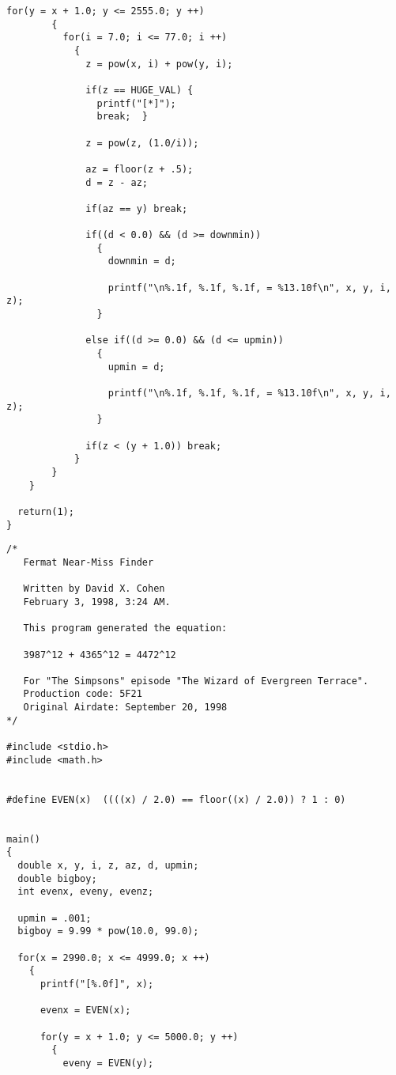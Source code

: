 \begin{appendix}
\begin{lstlisting}[caption={Fermat Near-Miss Finder (Version 1)}, captionpos=b]
      for(y = x + 1.0; y <= 2555.0; y ++)
        {
          for(i = 7.0; i <= 77.0; i ++)
            {
              z = pow(x, i) + pow(y, i);

              if(z == HUGE_VAL) {
                printf("[*]");
                break;  }

              z = pow(z, (1.0/i));

              az = floor(z + .5);
              d = z - az;

              if(az == y) break;

              if((d < 0.0) && (d >= downmin))
                {
                  downmin = d;

                  printf("\n%.1f, %.1f, %.1f, = %13.10f\n", x, y, i, z);
                }

              else if((d >= 0.0) && (d <= upmin))
                {
                  upmin = d;

                  printf("\n%.1f, %.1f, %.1f, = %13.10f\n", x, y, i, z);
                }

              if(z < (y + 1.0)) break;
            }
        }
    }

  return(1);
}
\end{lstlisting}

\begin{lstlisting}[caption={Fermat Near-Miss Finder (Version 2)}, captionpos=b]
/*
   Fermat Near-Miss Finder

   Written by David X. Cohen
   February 3, 1998, 3:24 AM.
   
   This program generated the equation:

   3987^12 + 4365^12 = 4472^12

   For "The Simpsons" episode "The Wizard of Evergreen Terrace".
   Production code: 5F21
   Original Airdate: September 20, 1998
*/

#include <stdio.h>
#include <math.h>


#define EVEN(x)  ((((x) / 2.0) == floor((x) / 2.0)) ? 1 : 0)


main()
{
  double x, y, i, z, az, d, upmin;
  double bigboy;
  int evenx, eveny, evenz;
  
  upmin = .001;
  bigboy = 9.99 * pow(10.0, 99.0);

  for(x = 2990.0; x <= 4999.0; x ++)
    {
      printf("[%.0f]", x);

      evenx = EVEN(x);
      
      for(y = x + 1.0; y <= 5000.0; y ++)
        {
          eveny = EVEN(y);


\end{lstlisting}
\end{appendix}
